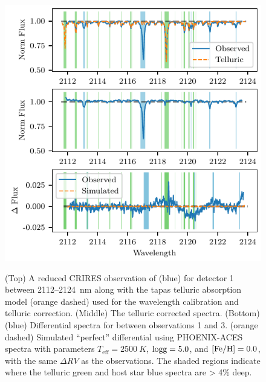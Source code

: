 \begin{figure}
	\includegraphics[width=\hsize]{figures/direct-recovery/differential.pdf}\\
	\caption{ (Top) A reduced CRIRES observation of  (blue) for detector 1 between 2112--2124~nm along with the tapas telluric absorption model ({orange} dashed) used for the wavelength calibration and telluric correction. (Middle) The telluric corrected spectra. (Bottom) ({blue}) Differential spectra for  between observations 1 and 3. ({orange} dashed) Simulated ``perfect'' differential using PHOENIX-ACES spectra with parameters \(T_{\textrm{eff}} = 2500~K \), \(\rm logg=5.0\), and \(\rm [Fe/H]=0.0 \), with the same \(\Delta RV \) as the observations. The shaded regions indicate where the telluric {green} and host star {blue} spectra are > 4\%  deep.}
	\label{fig:spectral_example}
\end{figure}


